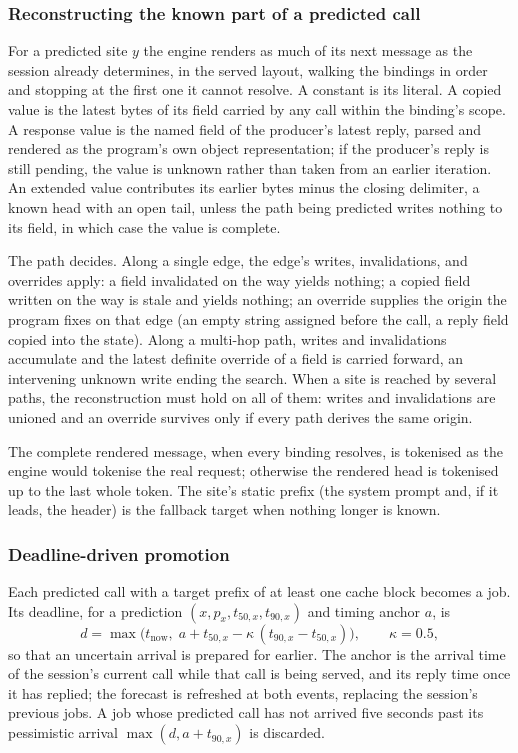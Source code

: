 \subsubsection{Reconstructing the known part of a predicted call}
\label{subsubsec:reconstruct}
For a predicted site $y$ the engine renders as much of its next message as the session already determines, in the served layout, walking the bindings in order and stopping at the first one it cannot resolve. A constant is its literal. A copied value is the latest bytes of its field carried by any call within the binding's scope. A response value is the named field of the producer's latest reply, parsed and rendered as the program's own object representation; if the producer's reply is still pending, the value is unknown rather than taken from an earlier iteration. An extended value contributes its earlier bytes minus the closing delimiter, a known head with an open tail, unless the path being predicted writes nothing to its field, in which case the value is complete.

The path decides. Along a single edge, the edge's writes, invalidations, and overrides apply: a field invalidated on the way yields nothing; a copied field written on the way is stale and yields nothing; an override supplies the origin the program fixes on that edge (an empty string assigned before the call, a reply field copied into the state). Along a multi-hop path, writes and invalidations accumulate and the latest definite override of a field is carried forward, an intervening unknown write ending the search. When a site is reached by several paths, the reconstruction must hold on all of them: writes and invalidations are unioned and an override survives only if every path derives the same origin.

The complete rendered message, when every binding resolves, is tokenised as the engine would tokenise the real request; otherwise the rendered head is tokenised up to the last whole token. The site's static prefix (the system prompt and, if it leads, the header) is the fallback target when nothing longer is known.

\subsubsection{Deadline-driven promotion}
Each predicted call with a target prefix of at least one cache block becomes a job. Its deadline, for a prediction $(x,p_x,t_{50,x},t_{90,x})$ and timing anchor $a$, is
\[
d=\max\bigl(t_{\mathrm{now}},\;a+t_{50,x}-\kappa\,(t_{90,x}-t_{50,x})\bigr),\qquad\kappa=0.5,
\]
so that an uncertain arrival is prepared for earlier. The anchor is the arrival time of the session's current call while that call is being served, and its reply time once it has replied; the forecast is refreshed at both events, replacing the session's previous jobs. A job whose predicted call has not arrived five seconds past its pessimistic arrival $\max(d,a+t_{90,x})$ is discarded.


